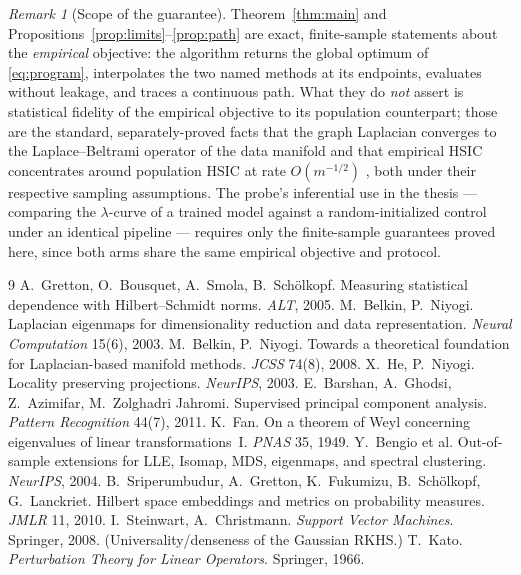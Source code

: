 \documentclass[11pt]{article}
\theoremstyle{remark}
\newtheorem{remark}{Remark}
\begin{document}
\begin{remark}[Scope of the guarantee]
Theorem~\ref{thm:main} and Propositions~\ref{prop:limits}--\ref{prop:path} are exact,
finite-sample statements about the \emph{empirical} objective: the algorithm returns the
global optimum of \eqref{eq:program}, interpolates the two named methods at its
endpoints, evaluates without leakage, and traces a continuous path. What they do
\emph{not} assert is statistical fidelity of the empirical objective to its population
counterpart; those are the standard, separately-proved facts that the graph Laplacian
converges to the Laplace--Beltrami operator of the data manifold
\cite{belkin2008towards} and that empirical HSIC concentrates around population HSIC at
rate $O(m^{-1/2})$ \cite{gretton2005hsic}, both under their respective sampling
assumptions. The probe's inferential use in the thesis --- comparing the $\lambda$-curve
of a trained model against a random-initialized control under an identical pipeline ---
requires only the finite-sample guarantees proved here, since both arms share the same
empirical objective and protocol.
\end{remark}

\begin{thebibliography}{9}\small
{} A.~Gretton, O.~Bousquet, A.~Smola, B.~Sch\"olkopf.
Measuring statistical dependence with Hilbert--Schmidt norms. \emph{ALT}, 2005.
 M.~Belkin, P.~Niyogi. Laplacian eigenmaps for dimensionality
reduction and data representation. \emph{Neural Computation} 15(6), 2003.
 M.~Belkin, P.~Niyogi. Towards a theoretical foundation for
Laplacian-based manifold methods. \emph{JCSS} 74(8), 2008.
 X.~He, P.~Niyogi. Locality preserving projections. \emph{NeurIPS},
2003.
 E.~Barshan, A.~Ghodsi, Z.~Azimifar, M.~Zolghadri Jahromi.
Supervised principal component analysis. \emph{Pattern Recognition} 44(7), 2011.
 K.~Fan. On a theorem of Weyl concerning eigenvalues of linear
transformations~I. \emph{PNAS} 35, 1949.
 Y.~Bengio et al. Out-of-sample extensions for LLE, Isomap, MDS,
eigenmaps, and spectral clustering. \emph{NeurIPS}, 2004.
 B.~Sriperumbudur, A.~Gretton, K.~Fukumizu, B.~Sch\"olkopf,
G.~Lanckriet. Hilbert space embeddings and metrics on probability measures.
\emph{JMLR} 11, 2010.
 I.~Steinwart, A.~Christmann. \emph{Support Vector
Machines}. Springer, 2008. (Universality/denseness of the Gaussian RKHS.)
 T.~Kato. \emph{Perturbation Theory for Linear Operators}. Springer,
1966.
\end{thebibliography}
\end{document}
